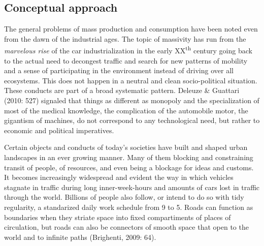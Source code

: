 



\pagebreak
\subsection*{Conceptual approach} %
The general problems of mass production and consumption %
have been noted even from the dawn of the industrial ages. 
The topic of massivity has run from the \textit{marvelous rise} of the car industrialization in the early XX\textsuperscript{th} century going back to the actual need to decongest traffic and search for new patterns of mobility and a sense of participating in the environment instead of driving over all ecosystems. This does not happen in a neutral and clean socio-political situation.
%
These conducts are part of a broad systematic pattern.
Deleuze \& Guattari (2010: 527)
signaled that
things as different as monopoly and the specialization of most of the medical knowledge,
the complication of the automobile motor, the gigantism of machines, do not correspond to any technological need,
but rather to economic and political imperatives. %

Certain objects and conducts of today's societies have built and shaped urban landscapes in an ever growing manner.
Many of them blocking and constraining transit of people, of resources, and even being a blockage for ideas and customs.
It becomes increasingly widespread and evident the way in which vehicles stagnate in traffic during 
long inner-week-hours and amounts of cars lost in traffic through the world. 
Billions of people also follow, or intend to do so with tidy regularity, a standarized daily work schedule from 9 to 5.
Roads can function as boundaries when they striate space into fixed compartiments of places of circulation,
but roads can also be connectors of smooth space that open to the world and to infinite paths (Brighenti, 2009: 64).

